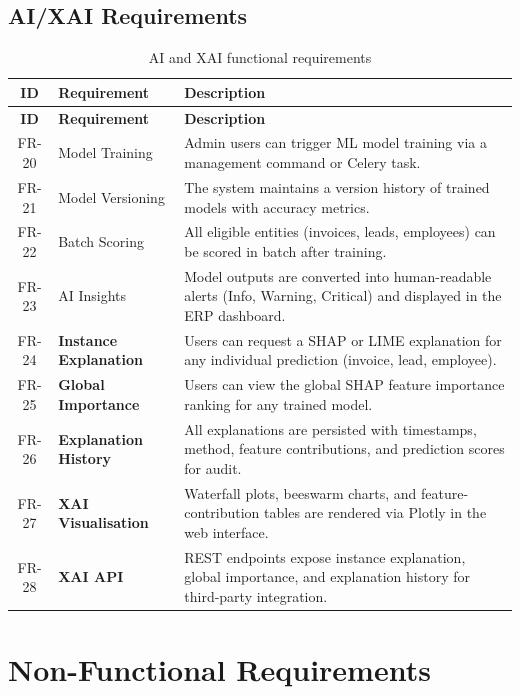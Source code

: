 \documentclass[12pt,a4paper]{report}
\begin{document}
\subsection{AI/XAI Requirements}

\begin{longtable}{c p{3cm} p{8cm}}
\caption{AI and XAI functional requirements} \label{tab:ai_xai_req} \\
\toprule
\textbf{ID} & \textbf{Requirement} & \textbf{Description} \\
\midrule
\endfirsthead
\toprule
\textbf{ID} & \textbf{Requirement} & \textbf{Description} \\
\midrule
\endhead
FR-20 & Model Training & Admin users can trigger ML model training via a management command or Celery task. \\
FR-21 & Model Versioning & The system maintains a version history of trained models with accuracy metrics. \\
FR-22 & Batch Scoring & All eligible entities (invoices, leads, employees) can be scored in batch after training. \\
FR-23 & AI Insights & Model outputs are converted into human-readable alerts (Info, Warning, Critical) and displayed in the ERP dashboard. \\
FR-24 & \textbf{Instance Explanation} & Users can request a SHAP or LIME explanation for any individual prediction (invoice, lead, employee). \\
FR-25 & \textbf{Global Importance} & Users can view the global SHAP feature importance ranking for any trained model. \\
FR-26 & \textbf{Explanation History} & All explanations are persisted with timestamps, method, feature contributions, and prediction scores for audit. \\
FR-27 & \textbf{XAI Visualisation} & Waterfall plots, beeswarm charts, and feature-contribution tables are rendered via Plotly in the web interface. \\
FR-28 & \textbf{XAI API} & REST endpoints expose instance explanation, global importance, and explanation history for third-party integration. \\
\bottomrule
\end{longtable}

\section{Non-Functional Requirements}
\label{sec:nonfunctional_req}
\end{document}
